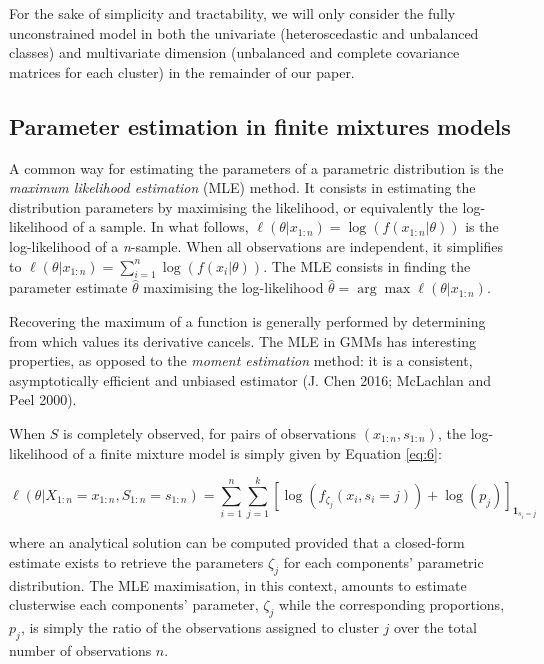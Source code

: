 For the sake of simplicity and tractability, we will only consider the
fully unconstrained model in both the univariate (heteroscedastic and
unbalanced classes) and multivariate dimension (unbalanced and complete
covariance matrices for each cluster) in the remainder of our paper.

\hypertarget{parameter-estimation-in-finite-mixtures-models}{%
\subsection{Parameter estimation in finite mixtures models}\label{parameter-estimation-in-finite-mixtures-models}}

A common way for estimating the parameters of a parametric distribution is
the \emph{maximum likelihood estimation} (MLE) method. It consists in
estimating the distribution parameters by maximising the likelihood, or
equivalently the log-likelihood of a sample. In what follows,
\(\ell(\theta|x_{1:n})=\log (f(x_{1:n}|\theta))\) is the log-likelihood of
a \emph{n}-sample. When all observations are independent, it simplifies to
\(\ell(\theta|x_{1:n}) = \sum_{i=1}^n \log (f(x_i|\theta))\). The MLE
consists in finding the parameter estimate \(\hat{\theta}\) maximising the
log-likelihood \(\hat{\theta} = \arg \max \ell (\theta | x_{1:n})\).

Recovering the maximum of a function is generally performed by
determining from which values its derivative cancels. The MLE in GMMs
has interesting properties, as opposed to the \emph{moment estimation}
method: it is a consistent, asymptotically efficient and unbiased
estimator (J. Chen 2016; McLachlan and Peel 2000).

When \(S\) is completely observed, for pairs of observations
\((x_{1:n}, s_{1:n})\), the log-likelihood of a finite mixture model is
simply given by Equation \eqref{eq:6}:

\begin{equation}
\ell(\theta|X_{1:n}=x_{1:n}, S_{1:n}=s_{1:n})=\sum_{i=1}^n \sum_{j=1}^k \left[\log\left(f_{\zeta_j} (x_i, s_i=j)\right) + \log(p_j) \right]_{\mathbf{1}_{s_i=j}}
\label{eq:6}
\end{equation}

where an analytical solution can be computed provided that a closed-form estimate exists to retrieve the parameters \(\zeta_j\) for each components' parametric distribution. The MLE maximisation, in this context, amounts to estimate clusterwise each components' parameter, \(\zeta_j\) while the corresponding proportions, \(p_j\), is simply the ratio of the observations assigned to cluster \(j\) over the total number of observations \(n\).

